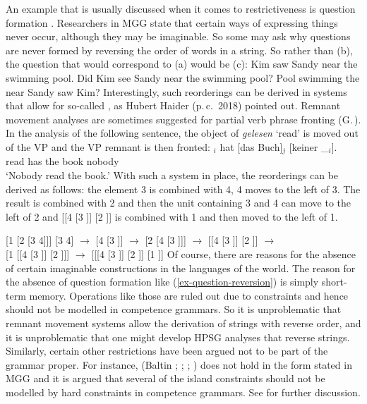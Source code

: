 \documentclass[output=paper
 	        ,biblatex
                ,babelshorthands
                ,newtxmath
                ,draftmode
                ,colorlinks, citecolor=brown
]{langscibook}
\begin{document}
An example that is usually discussed when it comes to restrictiveness is question
formation \citep{MMGRRBW2003a}. Researchers in MGG state that certain ways of expressing things never occur, although
they may be imaginable. So some may ask why questions are never formed by reversing the
order of words in a string. So rather than (b), the question that would correspond to
(a) would be (c):
\eal
\ex Kim saw Sandy near the swimming pool.
\ex Did Kim see Sandy near the swimming pool?
\ex\label{ex-question-reversion} 
Pool swimming the near Sandy saw Kim?
\zl
Interestingly, such reorderings can be derived in systems that allow for so-called
\emph{}, as Hubert Haider (p.\,c.\ 2018) pointed
out. Remnant movement analyses are sometimes suggested for partial verb phrase fronting
(G.\,\citealp{GMueller98a}). In the analysis of the following sentence, the object of \emph{gelesen}
`read' is moved out of the VP and the VP remnant is then fronted:
\ea
{}$_i$ hat [das Buch]$_j$ [keiner \_$_i$].\\
     {}        {}     read         has \spacebr{}the book \spacebr{}nobody\\
\glt `Nobody read the book.'
\z
\noindent
With such a system in place, the reorderings can be derived as follows: the element 3 is combined
with 4, 4 moves to the left of 3. The result is combined with 2 and then the unit containing 3
and 4 can move to the left of 2 and [[4 [3 \trace]] [2 \trace]] is combined with 1 and then moved to the left of 1.

\eal
\ex{} [1 [2 [3 4]]] 
\ex {} [3 4] $\to$ [4 [3 \trace]] $\to$ [2 [4 [3 \trace]]] $\to$ [[4 [3 \trace]] [2 \trace]] $\to$\\
    {} [1 [[4 [3 \trace]] [2 \trace]]] $\to$ [[[4 [3 \trace]] [2 \trace]] [1 \trace]]
\zl
Of course, there are reasons for the absence of certain imaginable constructions in the languages of
the world. The reason for the absence of question formation like (\ref{ex-question-reversion}) is
simply short-term memory. Operations like those are ruled out due to  constraints and
hence should not be modelled in competence grammars. So it is unproblematic that remnant movement
systems allow the derivation of strings with reverse order, and it is unproblematic that one might
develop HPSG analyses that reverse strings. Similarly, certain other restrictions have been argued
not to be part of the grammar proper. For instance,  (Baltin \citeyear[]{Baltin81a};
\citeyear{Baltin2006a}; \citealp[]{Rizzi82b}; \citealp[--40]{Chomsky86b}) does not hold in the form stated in
MGG \parencites{Mueller2004d}[Section~13.1.5]{MuellerGT-Eng1} and it is argued that several of the
island constraints should not be modelled by hard constraints in competence grammars. See
 for further discussion. 
\end{document}

